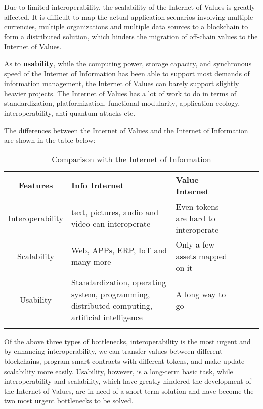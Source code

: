 \documentclass[a4paper,12pt]{article}
\begin{document}
Due to limited interoperability, the scalability of the Internet of Values is greatly affected. It is difficult to map the actual application scenarios involving multiple currencies, multiple organizations and multiple data sources to a blockchain to form a distributed solution, which hinders the migration of off-chain values to the Internet of Values.

As to \textbf{usability}, while the computing power, storage capacity, and synchronous speed of the Internet of Information has been able to support most demands of information management, the Internet of Values can barely support slightly heavier projects. The Internet of Values has a lot of work to do in terms of standardization, platformization, functional modularity, application ecology, interoperability, anti-quantum attacks etc.

The differences between the Internet of Values and the Internet of Information are shown in the table below:

\begin{table}[!hpb]\small
  \caption{Comparison with the Internet of Information}
  \label{tbl:keyproblems}
  \centering
  \begin{tabular}{cp{}lp{}lp{}}
\\
\hline

Features & Info Internet & Value Internet \\
\hline
Interoperability & text, pictures, audio and video can interoperate & Even tokens are hard to interoperate \\
Scalability & Web, APPs, ERP, IoT and many more & Only a few assets mapped on it\\
Usability & Standardization, operating system, programming, distributed computing, artificial intelligence & A long way to go\\

\hline
\\
 \end {tabular}
\end {table}

Of the above three types of bottlenecks, interoperability is the most urgent and by enhancing interoperability, we can transfer values between different blockchains, program smart contracts with different tokens, and make update scalability more easily. Usability, however, is a long-term basic task, while interoperability and scalability, which have greatly hindered the development of the Internet of Values, are in need of a short-term solution and have become the two most urgent bottlenecks to be solved.
\end{document}
